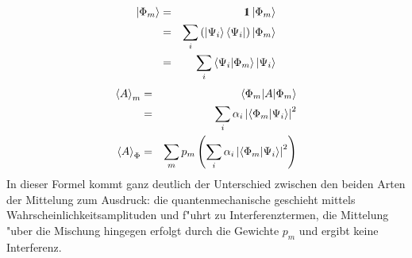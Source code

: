 \begin{itemize}
        \begin{eqnarray*}
           \left| \Phi_m \right> & = & \hbox{\small1\kern-3.8pt\normalsize1}\left| \Phi_m \right> \\
                        & = & \sum_i \left(\left| \Psi_i \right>\left< \Psi_i \right|\right)\left| \Phi_m \right> \\
                        & = & \sum_i \left< \Psi_i | \Phi_m \right>\left| \Psi_i \right>
        \end{eqnarray*}
        \begin{eqnarray*}
           \left< A \right>_m  & = & \left< \Phi_m | A | \Phi_m \right> \\
                       & = & \sum_i \alpha_i \left| \left< \Phi_m | \Psi_i \right> \right|^2 \\
           \left< A \right>_{\Phi} & = & \sum_m p_m \left( \sum_i \alpha_i \left| \left< \Phi_m | \Psi_i \right> \right|^2 \right)  
        \end{eqnarray*}
        In dieser Formel kommt ganz deutlich der Unterschied zwischen den beiden Arten der Mittelung zum Ausdruck: die quanten\-mechanische geschieht 
        mittels Wahrscheinlichkeitsamplituden und f"uhrt zu Interferenztermen, die Mittelung "uber die Mischung hingegen erfolgt durch die Gewichte $p_m$ und
        ergibt keine Interferenz.
    \end{itemize}


